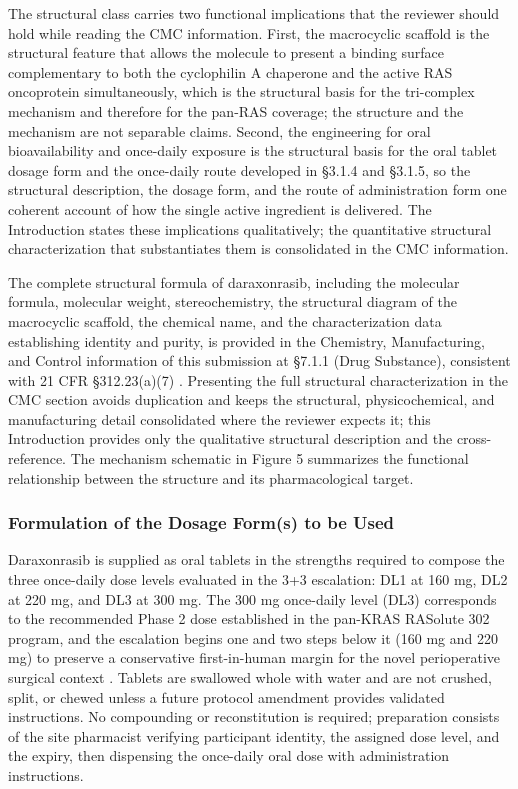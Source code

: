 The structural class carries two functional implications that the reviewer should
hold while reading the CMC information. First, the macrocyclic scaffold is the
structural feature that allows the molecule to present a binding surface complementary
to both the cyclophilin A chaperone and the active RAS oncoprotein simultaneously,
which is the structural basis for the tri-complex mechanism and therefore for the
pan-RAS coverage; the structure and the mechanism are not separable claims. Second,
the engineering for oral bioavailability and once-daily exposure is the structural
basis for the oral tablet dosage form and the once-daily route developed in
\S 3.1.4 and \S 3.1.5, so the structural description, the dosage form, and the route
of administration form one coherent account of how the single active ingredient is
delivered. The Introduction states these implications qualitatively; the
quantitative structural characterization that substantiates them is consolidated in
the CMC information.

The complete structural formula of daraxonrasib, including the molecular formula,
molecular weight, stereochemistry, the structural diagram of the macrocyclic
scaffold, the chemical name, and the characterization data establishing identity
and purity, is provided in the Chemistry, Manufacturing, and Control information of
this submission at \S 7.1.1 (Drug Substance), consistent with 21 CFR \S 312.23(a)(7)
\cite{phase1guidance, cfr312paiuni}. Presenting the full structural characterization
in the CMC section avoids duplication and keeps the structural, physicochemical, and
manufacturing detail consolidated where the reviewer expects it; this Introduction
provides only the qualitative structural description and the cross-reference. The
mechanism schematic in Figure 5 summarizes the functional relationship between the
structure and its pharmacological target.

\subsubsection{Formulation of the Dosage Form(s) to be Used}

Daraxonrasib is supplied as oral tablets in the strengths required to compose the
three once-daily dose levels evaluated in the 3+3 escalation: DL1 at 160 mg, DL2 at
220 mg, and DL3 at 300 mg. The 300 mg once-daily level (DL3) corresponds to the
recommended Phase 2 dose established in the pan-KRAS RASolute 302 program, and the
escalation begins one and two steps below it (160 mg and 220 mg) to preserve a
conservative first-in-human margin for the novel perioperative surgical context
\cite{daraxwhipple, onpremwhippl}. Tablets are swallowed whole with water and are
not crushed, split, or chewed unless a future protocol amendment provides validated
instructions. No compounding or reconstitution is required; preparation consists of
the site pharmacist verifying participant identity, the assigned dose level, and the
expiry, then dispensing the once-daily oral dose with administration instructions.

